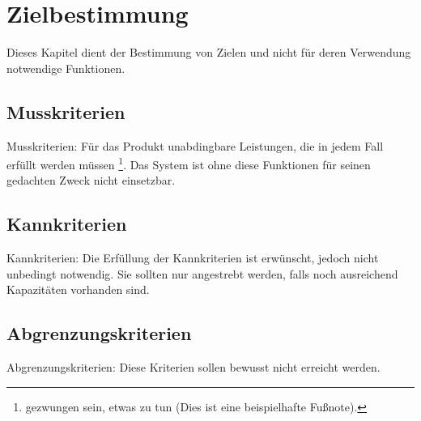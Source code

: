 \chapter{Zielbestimmung}
Dieses Kapitel dient der Bestimmung von Zielen und nicht für deren Verwendung
notwendige Funktionen.
 
\section{Musskriterien}
Musskriterien: Für das Produkt unabdingbare Leistungen, die in jedem Fall
erfüllt werden müssen \footnote{gezwungen sein, etwas zu tun (Dies ist eine
beispielhafte Fußnote).}. Das System ist ohne diese Funktionen für seinen
gedachten Zweck nicht einsetzbar.
 
\section{Kannkriterien}
Kannkriterien: Die Erfüllung der Kannkriterien ist erwünscht, jedoch nicht
unbedingt notwendig. Sie sollten nur angestrebt werden, falls noch ausreichend
Kapazitäten vorhanden sind.
 
\section{Abgrenzungskriterien}
Abgrenzungskriterien: Diese Kriterien sollen bewusst nicht erreicht werden.
